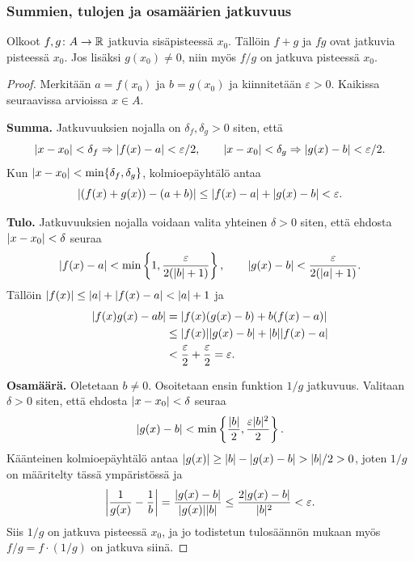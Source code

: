 \documentclass[11pt,a4paper]{amsart}
\begin{document}
\newpage
\subsubsection*{Summien, tulojen ja osamäärien jatkuvuus}

\begin{theorem}
  Olkoot $f,g\colon A\to\mathbb{R}$ jatkuvia sisäpisteessä $x_0$.
  Tällöin $f+g$ ja $fg$ ovat jatkuvia pisteessä $x_0$.
  Jos lisäksi $g(x_0)\ne0$, niin myös $f/g$ on jatkuva
  pisteessä $x_0$.
\end{theorem}
\begin{proof}
  Merkitään $a=f(x_0)$ ja $b=g(x_0)$ ja kiinnitetään
  $\varepsilon>0$. Kaikissa seuraavissa arvioissa $x\in A$.

  \smallskip
  \noindent\textbf{Summa.}
  Jatkuvuuksien nojalla on $\delta_f,\delta_g>0$ siten, että
  \[
    \lvert x-x_0\rvert<\delta_f\Rightarrow\lvert f(x)-a\rvert<\varepsilon/2,
    \qquad
    \lvert x-x_0\rvert<\delta_g\Rightarrow\lvert g(x)-b\rvert<\varepsilon/2.
  \]
  Kun $\lvert x-x_0\rvert<\min\{\delta_f,\delta_g\}$, kolmioepäyhtälö antaa
  \[
    \lvert(f(x)+g(x))-(a+b)\rvert
    \le\lvert f(x)-a\rvert+\lvert g(x)-b\rvert<\varepsilon.
  \]

  \smallskip
  \noindent\textbf{Tulo.}
  Jatkuvuuksien nojalla voidaan valita yhteinen $\delta>0$ siten,
  että ehdosta $\lvert x-x_0\rvert<\delta$ seuraa
  \[
    \lvert f(x)-a\rvert<\min\left\{1,\frac{\varepsilon}{2(\lvert b\rvert+1)}\right\},
    \qquad
    \lvert g(x)-b\rvert<\frac{\varepsilon}{2(\lvert a\rvert+1)}.
  \]
  Tällöin $\lvert f(x)\rvert\le\lvert a\rvert+\lvert f(x)-a\rvert<\lvert a\rvert+1$ ja
  \begin{align*}
    \lvert f(x)g(x)-ab\rvert
    &=\lvert f(x)(g(x)-b)+b(f(x)-a)\rvert\\
    &\le\lvert f(x)\rvert\lvert g(x)-b\rvert+\lvert b\rvert\lvert f(x)-a\rvert\\
    &<\frac{\varepsilon}{2}+\frac{\varepsilon}{2}=\varepsilon.
  \end{align*}

  \smallskip
  \noindent\textbf{Osamäärä.}
  Oletetaan $b\ne0$. Osoitetaan ensin funktion $1/g$ jatkuvuus.
  Valitaan $\delta>0$ siten, että ehdosta $\lvert x-x_0\rvert<\delta$ seuraa
  \[
    \lvert g(x)-b\rvert<\min\left\{\frac{\lvert b\rvert}2,
    \frac{\varepsilon\lvert b\rvert^2}{2}\right\}.
  \]
  Käänteinen kolmioepäyhtälö antaa
  $\lvert g(x)\rvert\ge\lvert b\rvert-\lvert g(x)-b\rvert>\lvert b\rvert/2>0$, joten
  $1/g$ on määritelty tässä ympäristössä ja
  \[
    \left|\frac1{g(x)}-\frac1b\right|
    =\frac{\lvert g(x)-b\rvert}{\lvert g(x)\rvert\lvert b\rvert}
    \le\frac{2\lvert g(x)-b\rvert}{\lvert b\rvert^2}<\varepsilon.
  \]
  Siis $1/g$ on jatkuva pisteessä $x_0$, ja jo todistetun
  tulosäännön mukaan myös $f/g=f\cdot(1/g)$ on jatkuva siinä.
\end{proof}
\end{document}

